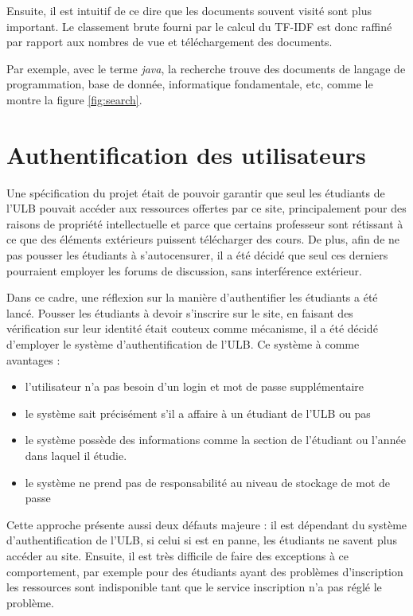 \documentclass[a4paper,12pt]{article}
\begin{document}
Ensuite, il est intuitif de ce dire que les documents souvent visité sont
plus important. Le classement brute fourni par le calcul du TF-IDF est donc raffiné
par rapport aux nombres de vue et téléchargement des documents.

Par exemple, avec le terme \textit{java}, la recherche trouve des documents de langage
de programmation, base de donnée, informatique fondamentale, etc, comme le montre la figure
\ref{fig:search}.


\section{Authentification des utilisateurs}

Une spécification du projet était de pouvoir garantir que seul les étudiants de l'ULB
pouvait accéder aux ressources offertes par ce site, principalement pour des raisons
de propriété intellectuelle et parce que certains professeur sont rétissant à 
ce que des éléments extérieurs puissent télécharger des cours. De plus, afin
de ne pas pousser les étudiants à s'autocensurer, il a été décidé que seul ces derniers
pourraient employer les forums de discussion, sans interférence extérieur.

Dans ce cadre, une réflexion sur la manière d'authentifier les étudiants
a été lancé. Pousser les étudiants à devoir s'inscrire sur le site, en faisant des
vérification sur leur identité était couteux comme mécanisme, il a été décidé
d'employer le système d'authentification de l'ULB. Ce système à comme avantages :
\begin{itemize}
\item l'utilisateur n'a pas besoin d'un login et mot de passe supplémentaire
\item le système sait précisément s'il a affaire à un étudiant de l'ULB ou pas
\item le système possède des informations comme la section de l'étudiant ou
      l'année dans laquel il étudie.
\item le système ne prend pas de responsabilité au niveau de stockage de mot de passe
\end{itemize}

Cette approche présente aussi deux défauts majeure : il est dépendant du système
d'authentification de l'ULB, si celui si est en panne, les étudiants ne savent plus
accéder au site. Ensuite, il est très difficile de faire des exceptions à ce comportement,
par exemple pour des étudiants ayant des problèmes d'inscription les ressources
sont indisponible tant que le service inscription n'a pas réglé le problème.
\end{document}
